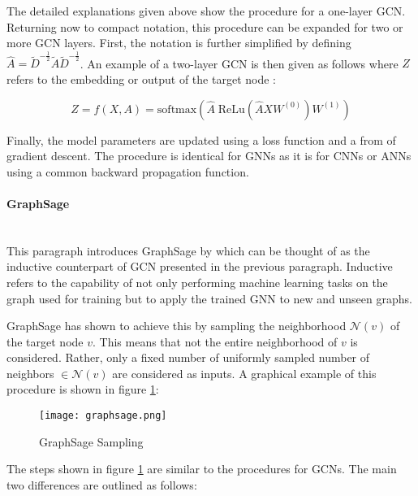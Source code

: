 	\noindent The detailed explanations given above show the procedure for a
	one-layer GCN. Returning now to compact notation, this procedure can be
	expanded for two or more GCN layers. First, the notation is further
	simplified by defining $\hat A = \tilde D^{-\frac{1}{2}}\tilde A \tilde
	D^{-\frac{1}{2}}$. An example of a two-layer GCN is then given as follows 
	where $Z$ refers to the embedding or output of the target node 
	\citep[p. 3]{kipf2016semi}:

	\begin{equation}
		Z = f(X,A) = \text{softmax}\left(\hat A \;\text{ReLu}\left(\hat A X
		W^{(0)}\right)W^{(1)}\right)
	\end{equation}

	\noindent Finally, the model parameters are updated using a loss function and
	a from of gradient descent. The procedure is identical for GNNs as it is
	for CNNs or ANNs using a common backward propagation function. 

	\paragraph{GraphSage} \mbox{}\\
	
	\noindent This paragraph introduces GraphSage by
	\cite{hamilton2017inductive} which can be thought of as the inductive 
	counterpart of GCN presented in the previous paragraph. Inductive refers to
	the capability of not only performing machine learning tasks on the graph 
	used for training but to apply the trained GNN to new and unseen graphs.
	

	GraphSage has shown to achieve this by sampling the neighborhood
	$\mathcal{N}(v)$ of the target node $v$. This means that not the entire
	neighborhood of $v$ is considered. Rather, only a fixed number of uniformly 
	sampled number of neighbors $\in\mathcal{N}(v)$ are considered as inputs. 
	A graphical example of this procedure is shown in figure 
	\ref{fig:GraphSage_sample}:


	\begin{figure}[h]
		\centering
		\texttt{[image: graphsage.png]}
		\caption{GraphSage Sampling}
		\cite[p. 2]{hamilton2017inductive}
		\label{fig:GraphSage_sample}
	\end{figure}

	\noindent The steps shown in figure \ref{fig:GraphSage_sample} are similar
	to the procedures for GCNs. The main two differences are outlined as
	follows:

